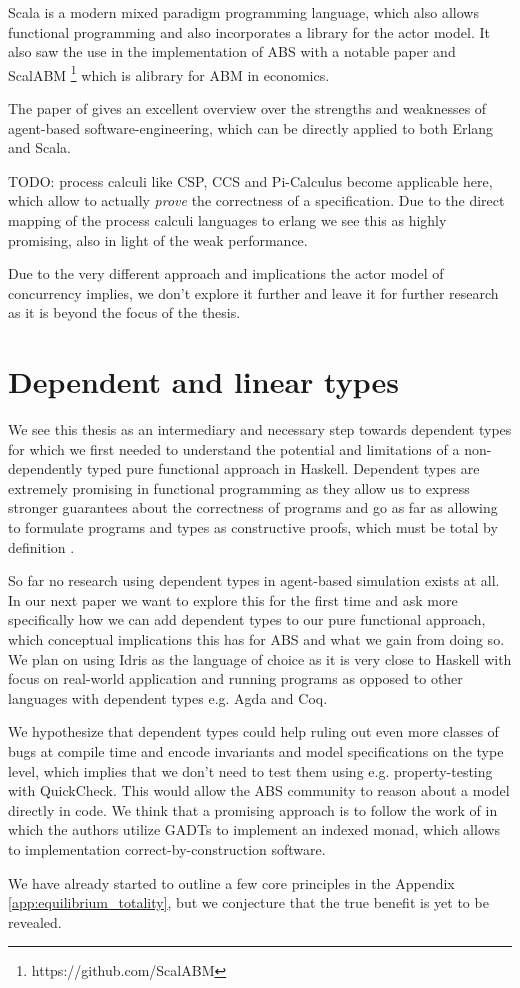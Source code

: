 Scala is a modern mixed paradigm programming language, which also allows functional programming and also incorporates a library for the actor model. It also saw the use in the implementation of ABS with a notable paper \cite{krzywicki_massively_2015} and ScalABM \footnote{https://github.com/ScalABM} which is alibrary for ABM in economics.

The paper of \cite{jennings_agent-based_2000} gives an excellent overview over the strengths and weaknesses of agent-based software-engineering, which can be directly applied to both Erlang and Scala.

TODO: process calculi like CSP, CCS and Pi-Calculus become applicable here, which allow to actually \textit{prove} the correctness of a specification. Due to the direct mapping of the process calculi languages to erlang we see this as highly promising, also in light of the weak performance.

Due to the very different approach and implications the actor model of concurrency implies, we don't explore it further and leave it for further research as it is beyond the focus of the thesis.

\section{Dependent and linear types}
We see this thesis as an intermediary and necessary step towards dependent types for which we first needed to understand the potential and limitations of a non-dependently typed pure functional approach in Haskell. Dependent types are extremely promising in functional programming as they allow us to express stronger guarantees about the correctness of programs and go as far as allowing to formulate programs and types as constructive proofs, which must be total by definition \cite{thompson_type_1991, altenkirch_why_2005, altenkirch_pi_2010}.

So far no research using dependent types in agent-based simulation exists at all. In our next paper we want to explore this for the first time and ask more specifically how we can add dependent types to our pure functional approach, which conceptual implications this has for ABS and what we gain from doing so. We plan on using Idris \cite{brady_idris_2013} as the language of choice as it is very close to Haskell with focus on real-world application and running programs as opposed to other languages with dependent types e.g. Agda and Coq.

We hypothesize that dependent types could help ruling out even more classes of bugs at compile time and encode invariants and model specifications on the type level, which implies that we don't need to test them using e.g. property-testing with QuickCheck. This would allow the ABS community to reason about a model directly in code. We think that a promising approach is to follow the work of \cite{brady_programming_2013, fowler_dependent_2014, brady_state_2016} in which the authors utilize GADTs to implement an indexed monad, which allows to implementation correct-by-construction software.

We have already started to outline a few core principles in the Appendix \ref{app:equilibrium_totality}, but we conjecture that the true benefit is yet to be revealed.